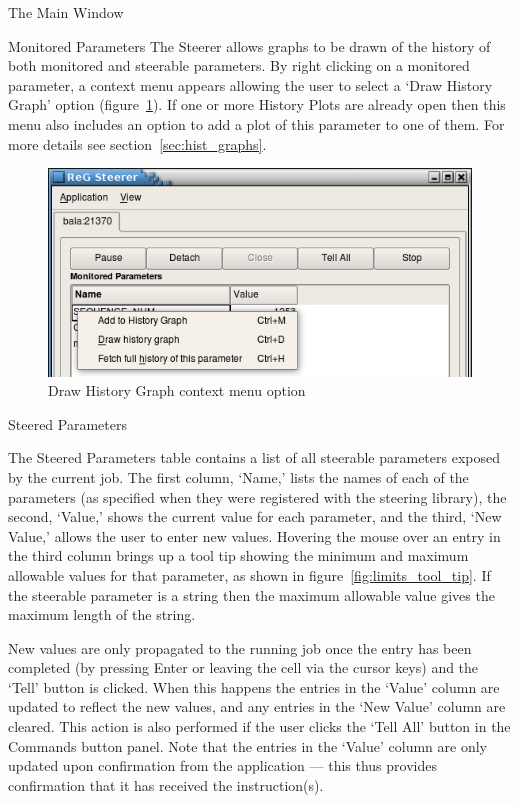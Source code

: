 \documentclass[a4paper,twoside]{article}
\begin{document}
\begin{section}{The Main Window}
\begin{subsection}{Monitored Parameters}
The Steerer allows graphs to be drawn of the history of both monitored
and steerable parameters. By right clicking on a monitored parameter,
a context menu appears allowing the user to select a `Draw History
Graph' option (figure~\ref{fig:hist_graph_context_menu}). If one or
more History Plots are already open then this menu also includes an
option to add a plot of this parameter to one of them. For more
details see section~\ref{sec:hist_graphs}.

\begin{figure}
\centerline{\includegraphics{hist_plot_context_menu.png}}
\caption{Draw History Graph context menu option}
\label{fig:hist_graph_context_menu}
\end{figure}

\end{subsection} %


\begin{subsection}{Steered Parameters}
\label{sec:steered_params}

The Steered Parameters table contains a list of all steerable
parameters exposed by the current job. The first column, `Name,' lists
the names of each of the parameters (as specified when they were
registered with the steering library), the second, `Value,' shows the
current value for each parameter, and the third, `New Value,' allows
the user to enter new values. Hovering the mouse over an entry in the
third column brings up a tool tip showing the minimum and maximum
allowable values for that parameter, as shown in
figure~\ref{fig:limits_tool_tip}.  If the steerable parameter is a
string then the maximum allowable value gives the maximum length of
the string.

New values are only propagated to the running job once the entry has
been completed (by pressing Enter or leaving the cell via the cursor
keys) and the `Tell' button is clicked. When this happens the entries
in the `Value' column are updated to reflect the new values, and any
entries in the `New Value' column are cleared. This action is also
performed if the user clicks the `Tell All' button in the Commands button
panel.  Note that the entries in the `Value' column are only updated
upon confirmation from the application --- this thus provides
confirmation that it has received the instruction(s).


\end{subsection}
\end{section}
\end{document}
